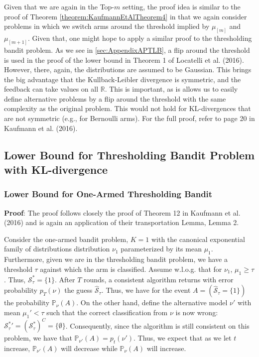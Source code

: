 \documentclass[11pt,]{article}
\begin{document}
Given that we are again in the Top-\(m\) setting, the proof idea is
similar to the proof of Theorem \ref{theorem:KaufmannEtAlTheorem4} in
that we again consider problems in which we switch arms around the
threshold implied by \(\mu_{[m]}\) and \(\mu_{[m+1]}\). Given that, one
might hope to apply a similar proof to the thresholding bandit problem.
As we see in \autoref{sec:AppendixAPTLB}, a flip around the threshold is
used in the proof of the lower bound in Theorem 1 of Locatelli et al.
(2016). However, there, again, the distributions are assumed to be
Gaussian. This brings the big advantage that the Kullback-Leibler
divergence is symmetric, and the feedback can take values on all
\(\mathbb{R}\). This is important, as is allows us to easily define
alternative problems by a flip around the threshold with the same
complexity as the original problem. This would not hold for
KL-divergences that are not symmetric (e.g., for Bernoulli arms). For
the full proof, refer to page 20 in Kaufmann et al. (2016).

\subsection{\texorpdfstring{Lower Bound for Thresholding Bandit Problem
with KL-divergence
\label{sec:corollaryLBTBPproof}}{Lower Bound for Thresholding Bandit Problem with KL-divergence }}\label{lower-bound-for-thresholding-bandit-problem-with-kl-divergence}

\subsubsection{\texorpdfstring{Lower Bound for One-Armed Thresholding
Bandit
\label{sec:corollaryLB1TBPproof}}{Lower Bound for One-Armed Thresholding Bandit }}\label{lower-bound-for-one-armed-thresholding-bandit}

\textbf{Proof}: The proof follows closely the proof of Theorem 12 in
Kaufmann et al. (2016) and is again an application of their
transportation Lemma, Lemma 2.

Consider the one-armed bandit problem, \(K = 1\) with the canonical
exponential family of distributions distribution \(\nu_1\) parameterized
by its mean \(\mu_1\). Furthermore, given we are in the thresholding
bandit problem, we have a threshold \(\tau\) against which the arm is
classified. Assume w.l.o.g. that for \(\nu_1\), \(\mu_1 \geq \tau\).
Thus, \(\mathcal{S}_{\tau}^* = \{1\}\). After \(T\) rounds, a consistent
algorithm returns with error probability \(p_T(\nu)\) the guess
\(\hat{\mathcal{S}}_{\tau}\). Thus, we have for the event
\(A = (\hat{\mathcal{S}}_\tau = \{1\})\) the probability
\(\mathbb{P}_{\nu}(A)\). On the other hand, define the alternative model
\(\nu'\) with mean \(\mu_1' < \tau\) such that the correct
classification from \(\nu\) is now wrong:
\(\mathcal{S}_{\tau}^* {'} = (\mathcal{S}_{\tau}^*)^C = \{\emptyset\}\).
Consequently, since the algorithm is still consistent on this problem,
we have that \(\mathbb{P}_{\nu'}(A) = p_t(\nu')\). Thus, we expect that
as we let \(t\) increase, \(\mathbb{P}_{\nu'}(A)\) will decrease while
\(\mathbb{P}_{\nu}(A)\) will increase.
\end{document}
